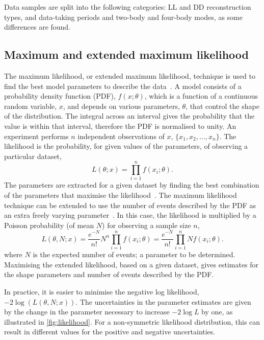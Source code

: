 Data samples are split into the following categories: LL and DD \KS reconstruction types, \runone and \runtwo data-taking periods and two-body and four-body modes, as some differences are found. 

\subsection{Maximum and extended maximum likelihood}
\label{sec:massfit:likelihood}

The maximum likelihood, or extended maximum likelihood, technique is used to find the best model parameters to describe the data~\cite{MLandEML,EML}. A model consists of a probability density function (PDF), $f(x;\theta)$, which is a function of a continuous random variable, $x$, and depends on various parameters, $\theta$, that control the shape of the distribution. The integral across an interval gives the probability that the value is within that interval, therefore the PDF is normalised to unity. An experiment performs $n$ independent observations of $x$, $\{x_1, x_2, ..., x_n\}$. The likelihood is the probability, for given values of the parameters, of observing a particular dataset,
\begin{equation}
L(\theta;x) = \prod_{i=1}^{n} f(x_i;\theta).
\end{equation}
The parameters are extracted for a given dataset by finding the best combination of the parameters that maximise the likelihood~\cite{MLandEML}. The maximum likelihood technique can be extended to use the number of events described by the PDF as an extra freely varying parameter~\cite{EML}. In this case, the likelihood is multiplied by a Poisson probability (of mean $N$) for observing a sample size $n$,
\begin{equation}
L(\theta, N;x) = \frac{e^{-N}}{n!}N^n \prod_{i=1}^{n} f(x_i;\theta) = \frac{e^{-N}}{n!} \prod_{i=1}^{n} N f(x_i;\theta).
\end{equation}
where $N$ is the expected number of events; a parameter to be determined. Maximising the extended likelihood, based on a given dataset, gives estimates for the shape parameters and number of events described by the PDF.

In practice, it is easier to minimise the negative log likelihood, $-2\log(L(\theta, N;x))$. The uncertainties in the parameter estimates are given by the change in the parameter necessary to increase $-2\log L$ by one, as illustrated in \fig\ref{fig:likelihood}. For a non-symmetric likelihood distribution, this can result in different values for the positive and negative uncertainties. 

